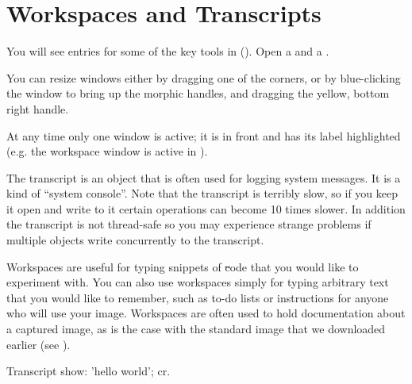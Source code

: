 \documentclass[a4paper,10pt,twoside]{book}
\begin{document}
\section{Workspaces and Transcripts}
\label{sec:transcript}

You will see entries for some of the key tools in \sq ().
Open a  and a .

You can resize windows either by dragging one of the corners, or by blue-clicking the window to bring up the morphic handles, and dragging the yellow, bottom right handle.

At any time only one window is active; it is in front and has its label highlighted (e.g. the workspace window is active in ).

The transcript is an object that is often used for logging system messages.
It is a kind of ``system console''.
Note that the transcript is terribly slow, so if you keep it open and write to it certain operations can become 10 times slower.
In addition the transcript is not thread-safe so you may experience strange problems if multiple objects write concurrently to the transcript.

Workspaces are useful for typing snippets of \st code that you would like to experiment with.
You can also use workspaces simply for typing arbitrary text that you would like to remember, such as to-do lists or instructions for anyone who will use your image.
Workspaces are often used to hold documentation about a captured image, as is the case with the standard image that we downloaded earlier (see ).

\begin{code}{}
Transcript show: 'hello world'; cr.
\end{code}

\end{document}

